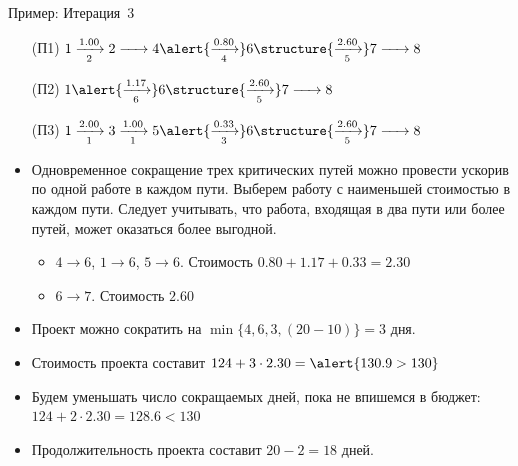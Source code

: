 \documentclass[unicode,11pt,notheorems]{beamer}
\begin{document}
\begin{frame}{Пример: Итерация~3}
	\begin{itemize}
	\item[(П1)]
		$1 \xrightarrow[2]{1.00}  2 \xrightarrow[]{\phantom{0.25}} 4 \alert{\xrightarrow[4]{0.80}} 6 \structure{\xrightarrow[5]{2.60}} 7 \xrightarrow[]{\phantom{0.67}} 8$
	\item[(П2)] 
		$1 \alert{\xrightarrow[6]{1.17}}  6 \structure{\xrightarrow[5]{2.60}} 7  \xrightarrow[]{\phantom{0.67}} 8$
	\item[(П3)] 
		$1 \xrightarrow[1]{2.00} 3 \xrightarrow[1]{1.00} 5 \alert{\xrightarrow[3]{0.33}}  6 \structure{\xrightarrow[5]{2.60}} 7  \xrightarrow[]{\phantom{0.67}} 8$
	
	\end{itemize}
	
	
	\begin{itemize}
	\item 
		Одновременное сокращение трех критических путей можно провести ускорив по одной работе в каждом пути. Выберем работу с наименьшей стоимостью в каждом пути.	\alert{Следует учитывать, что работа, входящая в два пути или более путей, может оказаться более выгодной.}
		\begin{itemize}
		\item 
			$4\to 6$, $1\to 6$, $5\to 6$. Стоимость $0.80+1.17+0.33=2.30$
		\item 
			$6\to 7$.\hspace{2.18cm} Стоимость $2.60$			
		\end{itemize}
	\item 
		Проект можно сократить на $\min\{4,6,3,(20-10)\}=3$ дня.	
	\item 
		Стоимость проекта составит $124+3 \cdot 2.30= \alert{130.9> 130}$
	\item 
		Будем уменьшать число сокращаемых дней, пока не впишемся в бюджет: \alert{ $124+2 \cdot 2.30=128.6< 130$}
	\item 
		Продолжительность проекта составит $20-2=18$ дней.			
\end{itemize}
\end{frame}
\end{document}
